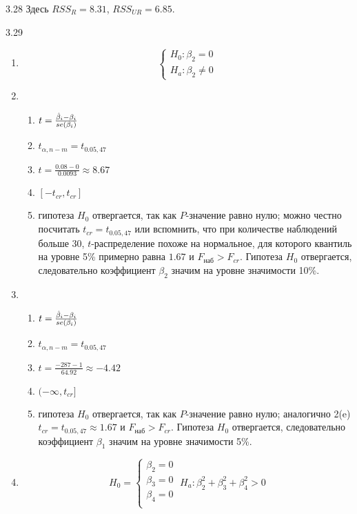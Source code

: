 \protect \hypertarget {soln:3.28}{}
\begin{solution}{{3.28}}
Здесь $RSS_{R}=8.31$, $RSS_{UR}=6.85$.
\end{solution}
\protect \hypertarget {soln:3.29}{}
\begin{solution}{{3.29}}
\begin{enumerate}
\item
\[
\begin{cases}
H_0: \beta_2=0\\
H_a: \beta_2\neq 0
\end{cases}
\]

\item
\begin{enumerate}
\item $t=\frac{\hat{\beta}_i-\beta_i}{se(\beta_i)}$
\item $t_{\alpha,n-m}=t_{0.05,47}$
\item $t=\frac{0.08-0}{0.0093}\approx 8.67$
\item $[-t_{cr},t_{cr}]$
\item гипотеза $H_0$ отвергается, так как $P$-значение равно нулю; можно честно посчитать $t_{cr}=t_{0.05,47}$ или вспомнить, что при количестве наблюдений больше 30, $t$-распределение похоже на нормальное, для которого квантиль на уровне 5\% примерно равна $1.67$ и $F_{\text{наб}}>F_{cr}$. Гипотеза $H_0$ отвергается, следовательно коэффициент $\beta_2$ значим на уровне значимости 10\%.
\end{enumerate}

\item
\begin{enumerate}
\item $t=\frac{\hat{\beta}_i-\beta_i}{se(\beta_i)}$
\item $t_{\alpha,n-m}=t_{0.05,47}$
\item $t=\frac{-287-1}{64.92}\approx -4.42$
\item $(-\infty,t_{cr}]$
\item гипотеза $H_0$ отвергается, так как $P$-значение равно нулю; аналогично 2(e) $t_{cr}=t_{0.05,47}\approx 1.67$ и $F_{\text{наб}}>F_{cr}$. Гипотеза $H_0$ отвергается, следовательно коэффициент $\beta_1$ значим на уровне значимости 5\%.
\end{enumerate}

\item
\[
H_0=
\begin{cases}
\beta_2=0\\
\beta_3=0\\
\beta_4=0\\
\end{cases}
\;
H_a:\beta_2^2+\beta_3^2+\beta_4^2>0
\]


\end{enumerate}
\end{solution}
